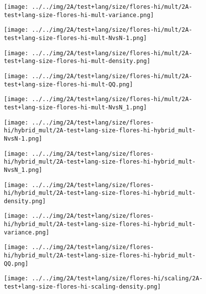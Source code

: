 \begin{figure}[H]
\centering	\texttt{[image: ../../img/2A/test+lang/size/flores-hi/mult/2A-test+lang-size-flores-hi-mult-variance.png]}
\end{figure}
\begin{figure}[H]
\centering	\texttt{[image: ../../img/2A/test+lang/size/flores-hi/mult/2A-test+lang-size-flores-hi-mult-NvsN-1.png]}
\end{figure}
\begin{figure}[H]
\centering	\texttt{[image: ../../img/2A/test+lang/size/flores-hi/mult/2A-test+lang-size-flores-hi-mult-density.png]}
\end{figure}
\begin{figure}[H]
\centering	\texttt{[image: ../../img/2A/test+lang/size/flores-hi/mult/2A-test+lang-size-flores-hi-mult-QQ.png]}
\end{figure}
\begin{figure}[H]
\centering	\texttt{[image: ../../img/2A/test+lang/size/flores-hi/mult/2A-test+lang-size-flores-hi-mult-NvsN\_1.png]}
\end{figure}
\begin{figure}[H]
\centering	\texttt{[image: ../../img/2A/test+lang/size/flores-hi/hybrid\_mult/2A-test+lang-size-flores-hi-hybrid\_mult-NvsN-1.png]}
\end{figure}
\begin{figure}[H]
\centering	\texttt{[image: ../../img/2A/test+lang/size/flores-hi/hybrid\_mult/2A-test+lang-size-flores-hi-hybrid\_mult-NvsN\_1.png]}
\end{figure}
\begin{figure}[H]
\centering	\texttt{[image: ../../img/2A/test+lang/size/flores-hi/hybrid\_mult/2A-test+lang-size-flores-hi-hybrid\_mult-density.png]}
\end{figure}
\begin{figure}[H]
\centering	\texttt{[image: ../../img/2A/test+lang/size/flores-hi/hybrid\_mult/2A-test+lang-size-flores-hi-hybrid\_mult-variance.png]}
\end{figure}
\begin{figure}[H]
\centering	\texttt{[image: ../../img/2A/test+lang/size/flores-hi/hybrid\_mult/2A-test+lang-size-flores-hi-hybrid\_mult-QQ.png]}
\end{figure}
\begin{figure}[H]
\centering	\texttt{[image: ../../img/2A/test+lang/size/flores-hi/scaling/2A-test+lang-size-flores-hi-scaling-density.png]}
\end{figure}
